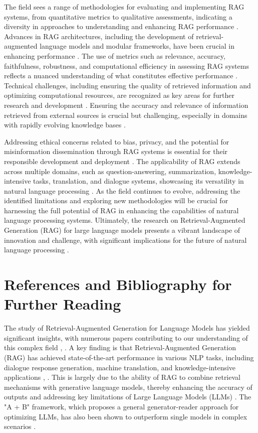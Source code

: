 \documentclass[conference]{IEEEtran}
\begin{document}
The field sees a range of methodologies for evaluating and implementing RAG systems, from quantitative metrics to qualitative assessments, indicating a diversity in approaches to understanding and enhancing RAG performance \cite{b9}. Advances in RAG architectures, including the development of retrieval-augmented language models and modular frameworks, have been crucial in enhancing performance \cite{b10}. The use of metrics such as relevance, accuracy, faithfulness, robustness, and computational efficiency in assessing RAG systems reflects a nuanced understanding of what constitutes effective performance \cite{b11}. Technical challenges, including ensuring the quality of retrieved information and optimizing computational resources, are recognized as key areas for further research and development \cite{b12}. Ensuring the accuracy and relevance of information retrieved from external sources is crucial but challenging, especially in domains with rapidly evolving knowledge bases \cite{b13}.

Addressing ethical concerns related to bias, privacy, and the potential for misinformation dissemination through RAG systems is essential for their responsible development and deployment \cite{b14}. The applicability of RAG extends across multiple domains, such as question-answering, summarization, knowledge-intensive tasks, translation, and dialogue systems, showcasing its versatility in natural language processing \cite{b15}. As the field continues to evolve, addressing the identified limitations and exploring new methodologies will be crucial for harnessing the full potential of RAG in enhancing the capabilities of natural language processing systems. Ultimately, the research on Retrieval-Augmented Generation (RAG) for large language models presents a vibrant landscape of innovation and challenge, with significant implications for the future of natural language processing \cite{b16}.

\section{References and Bibliography for Further Reading}
The study of Retrieval-Augmented Generation for Language Models has yielded significant insights, with numerous papers contributing to our understanding of this complex field \cite{b1}, \cite{b2}. A key finding is that Retrieval-Augmented Generation (RAG) has achieved state-of-the-art performance in various NLP tasks, including dialogue response generation, machine translation, and knowledge-intensive applications \cite{b3}, \cite{b4}. This is largely due to the ability of RAG to combine retrieval mechanisms with generative language models, thereby enhancing the accuracy of outputs and addressing key limitations of Large Language Models (LLMs) \cite{b5}. The "A + B" framework, which proposes a general generator-reader approach for optimizing LLMs, has also been shown to outperform single models in complex scenarios \cite{b6}.
\end{document}
